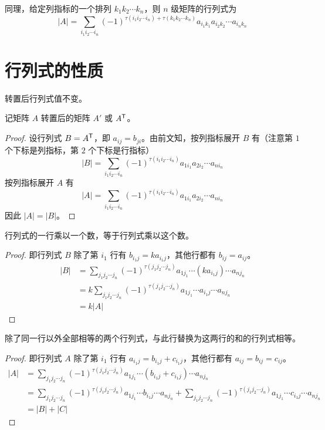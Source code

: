 同理，给定列指标的一个排列 $k_1k_2\cdots k_n$，则 $n$ 级矩阵的行列式为
\[|A| = \sum_{i_1i_2\cdots i_n}(-1)^{\tau(i_1i_2\cdots i_n)+\tau(k_1k_2\cdots k_n)}a_{i_1k_1}a_{i_2k_2}\cdots a_{i_nk_n}\]

\section{行列式的性质}

\begin{theorem}
	转置后行列式值不变。
\end{theorem}

记矩阵 $A$ 转置后的矩阵 $A'$ 或 ${A}^\mathsf{T}$。

\begin{proof}
	设行列式 $B={A}^\mathsf{T}$，即 $a_{ij}=b_{ji}$。由前文知，按列指标展开 $B$ 有（注意第 $1$ 个下标是列指标，第 $2$ 个下标是行指标）
	\[|B|=\sum_{i_1i_2\cdots i_n}(-1)^{\tau(i_1i_2\cdots i_n)}a_{1i_1}a_{2i_2}\cdots a_{ni_n}\]
	按列指标展开 $A$ 有
	\[|A|=\sum_{i_1i_2\cdots i_n}(-1)^{\tau(i_1i_2\cdots i_n)}a_{1i_1}a_{2i_2}\cdots a_{ni_n}\]
	因此 $|A|=|B|$。
\end{proof}

\begin{theorem}
	行列式的一行乘以一个数，等于行列式乘以这个数。
\end{theorem}

\begin{proof}
	即行列式 $B$ 除了第 $i_1$ 行有 $b_{i_1j}=ka_{i_1j}$，其他行都有 $b_{ij}=a_{ij}$。
	\begin{equation*}
		\begin{aligned}
			|B| & = \sum_{j_1j_2\cdots j_n}(-1)^{\tau(j_1j_2\cdots j_n)}a_{1j_1}\cdots (ka_{i_1j}) \cdots a_{nj_n} \\
			    & = k\sum_{j_1j_2\cdots j_n}(-1)^{\tau(j_1j_2\cdots j_n)}a_{1j_1}\cdots a_{i_1j} \cdots a_{nj_n}   \\
			    & =k|A|
		\end{aligned}
	\end{equation*}
\end{proof}

\begin{theorem}
	除了同一行以外全部相等的两个行列式，与此行替换为这两行的和的行列式相等。
\end{theorem}

\begin{proof}
	即行列式 $A$ 除了第 $i_1$ 行有 $a_{i_1j}=b_{i_1j}+c_{i_1j}$，其他行都有 $a_{ij}=b_{ij}=c_{ij}$。
	\begin{equation*}
		\begin{aligned}
			|A| & = \sum_{j_1j_2\cdots j_n}(-1)^{\tau(j_1j_2\cdots j_n)}a_{1j_1}\cdots (b_{i_1j}+c_{i_1j}) \cdots a_{nj_n}                                                                                  \\
			    & = \sum_{j_1j_2\cdots j_n}(-1)^{\tau(j_1j_2\cdots j_n)}a_{1j_1}\cdots b_{i_1j} \cdots a_{nj_n}+\sum_{j_1j_2\cdots j_n}(-1)^{\tau(j_1j_2\cdots j_n)}a_{1j_1}\cdots c_{i_1j} \cdots a_{nj_n} \\
			    & =|B|+|C|
		\end{aligned}
	\end{equation*}
\end{proof}

